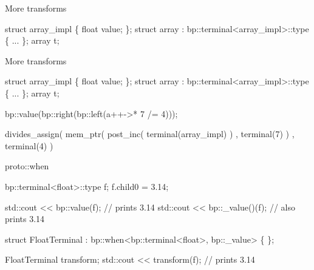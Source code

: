 \documentclass[9pt]{beamer}
\begin{document}
\begin{frame}[fragile]{More transforms}
\begin{semiverbatim}
struct array_impl \{ float value; \};
struct array : bp::terminal<array_impl>::type \{ ... \};
array t;












\end{semiverbatim}
\note{ }
\end{frame}


\begin{frame}[fragile]{More transforms}
\begin{semiverbatim}
struct array_impl \{ float value; \};
struct array : bp::terminal<array_impl>::type \{ ... \};
array t;

\alert<8>{bp::value(\alert<6>{bp::right(\alert<4>{bp::left(\alert<2>{\alert<5>{a++->* \alert<7,9>{7}} /= 4})})});}

\alert<3>{divides_assign(
\alert<5>{    mem_ptr(
        post_inc(
            terminal(array_impl)
        )
      , \alert<7>{terminal(\alert<9>{7})}
    )}
  , terminal(4)
)}
\end{semiverbatim}
\end{frame}


\begin{frame}[fragile]{proto::when}
\begin{semiverbatim}
bp::terminal<float>::type f;
f.child0 = 3.14;

std::cout << bp::value(f);    // prints 3.14
std::cout << bp::_value()(f); // also prints 3.14

struct FloatTerminal
: bp::when<bp::terminal<float>, bp::_value>
\{ \};

FloatTerminal transform;
std::cout << transform(f);  // prints 3.14




\end{semiverbatim}
\note{ }
\end{frame}
\end{document}
